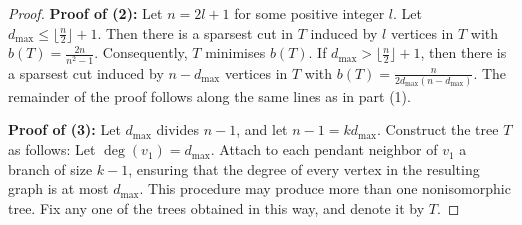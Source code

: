 \documentclass[10pt,a4paper]{amsart}
\begin{document}
\begin{proof}


\noindent\textbf{Proof of (2): } Let $n=2l+1$ for some positive integer $l$.
 Let $d_{\max} \leq \lfloor \frac{n}{2} \rfloor +1$. Then there is a sparsest cut in $T$ induced by $l$ vertices in $T$ with $b(T)=\frac{2n}{n^2-1}$. Consequently, $T$ minimises $b(T)$. If $d_{\max} > \lfloor \frac{n}{2} \rfloor +1$, then there is a sparsest cut induced by $n-d_{\max}$ vertices in $T$ with $b(T)=\frac{n}{2d_{\max}(n-d_{\max})}$. The remainder of the proof follows along the same lines as in part (1).





\noindent\textbf{Proof of (3):} Let $d_{\max}$ divides $n-1$, and let $n-1 = k d_{\max}$. Construct the tree $T$ as follows: Let $\deg(v_1)=d_{\max}$. Attach to each pendant neighbor of $v_1$ a branch of size $k-1$, ensuring that the degree of every vertex in the resulting graph is at most $d_{\max}$. This procedure may produce more than one nonisomorphic tree. Fix any one of the trees obtained in this way, and denote it by $T$. 
 

\end{proof}
\end{document}
